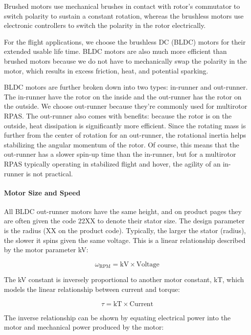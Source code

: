 Brushed motors use mechanical brushes in contact with rotor’s commutator to switch polarity to sustain a 
constant rotation, whereas the brushless motors use electronic controllers to switch the polarity in the 
rotor electrically. 

For the flight applications, we choose the brushless DC (BLDC) motors for their extended usable life time. 
BLDC motors are also much more efficient than brushed motors because we do not have to mechanically swap 
the polarity in the motor, which results in excess friction, heat, and potential sparking.

BLDC motors are further broken down into two types: in-runner and out-runner. The in-runner have the rotor 
on the inside and the out-runner has the rotor on the outside. We choose out-runner because they’re 
commonly used for multirotor RPAS. The out-runner also comes with benefits: because the rotor is on the 
outside, heat dissipation is significantly more efficient. Since the rotating mass is further from the 
center of rotation for an out-runner, the rotational inertia helps stabilizing the angular momentum of the 
rotor. Of course, this means that the out-runner has a slower spin-up time than the in-runner, but for a 
multirotor RPAS typically operating in stabilized flight and hover, the agility of an in-runner is not 
practical.

\paragraph{Motor Size and Speed}\label{section:motor-speed}

All BLDC out-runner motors have the same height, and on product pages they are often given the code 22XX to denote their stator size. The design parameter is the radius (XX on the product code). Typically, the larger the stator (radius), the slower it spins given the same voltage. This is a linear relationship described by the motor parameter kV:

$$
\omega_{\mathrm{RPM}} = \mathrm{kV} \times \mathrm{Voltage}
$$

The kV constant is inversely proportional to another motor constant, kT, which models the linear relationship between current and torque:

$$
\tau = \mathrm{kT} \times \mathrm{Current}
$$

The inverse relationship can be shown by equating electrical power into the motor and mechanical power produced by the motor:

